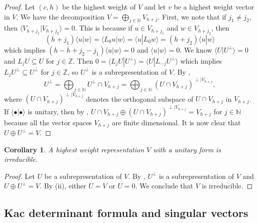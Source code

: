 \documentclass[a4paper, 12pt, reqno]{amsart}
\newtheorem{corollary}[theorem]{Corollary}
\theoremstyle{remark}
\numberwithin{equation}{subsection}
\begin{document}
\begin{proof}
  Let $(c, h)$ be the highest weight of $V$ and let $v$ be a highest weight vector in $V$.
  We have the decomposition $V = \bigoplus_{j \in \mathbb{N}}V_{h + j}$.
  First, we note that if $j_1 \neq j_2$, then $\langle V_{h + j_1}| V_{h + j_2}\rangle = 0$.
  This is because if $u \in V_{h + j_1}$ and $w \in V_{h + j_2}$, then
  \begin{equation*}
    (\overline{h} + j_1)\langle u| w\rangle = \langle L_0u| w\rangle = \langle u| L_0w\rangle = (h + j_2)\langle u| w\rangle
  \end{equation*}
  which implies $(h - \overline{h} + j_2 - j_1)\langle u| w\rangle = 0$ and $\langle u| w\rangle = 0$.
  We know $\langle U| U^{\perp}\rangle = 0$ and $L_jU \subseteq U$ for $j \in \mathbb{Z}$.
  Then $0 = \langle L_jU| U^{\perp}\rangle = \langle U| L_{-j}U^{\perp}\rangle$ which implies $L_jU^{\perp} \subseteq U^{\perp}$ for $j \in \mathbb{Z}$, so $U^{\perp}$ is a subrepresentation of $V$.
  By ,
  \begin{equation*}
     U^{\perp} = \bigoplus_{j \in \mathbb{N}}U^{\perp} \cap V_{h + j} = \bigoplus_{j \in \mathbb{N}}(U \cap V_{h + j})^{\perp|V_{h + j}},
  \end{equation*}
  where $(U \cap V_{h + j})^{\perp|V_{h + j}}$ denotes the orthogonal subspace of $U \cap V_{h + j}$ in $V_{h + j}$.
  If $\langle \bullet| \bullet\rangle$ is unitary, then by , $U \cap V_{h + j} \oplus (U \cap V_{h + j})^{\perp|V_{h + j}} = V_{h + j}$ for $j \in \mathbb{N}$ because all the vector spaces $V_{h + j}$ are finite dimensional.
  It is now clear that $U \oplus U^{\perp} = V$.
\end{proof}

\begin{corollary}
  \label{crl:2}
  A highest weight representation $V$ with a unitary form is irreducible.
\end{corollary}

\begin{proof}
  Let $U$ be a subrepresentation of $V$.
  By , $U^{\perp}$ is a subrepresentation of $V$ and $U\oplus U^{\perp} = V$.
  By (ii), either $U = V$ or $U = 0$.
  We conclude that $V$ is irreducible.
\end{proof}

\subsection{Kac determinant formula and singular vectors}
\label{sec:kac-dete-form}
\end{document}

